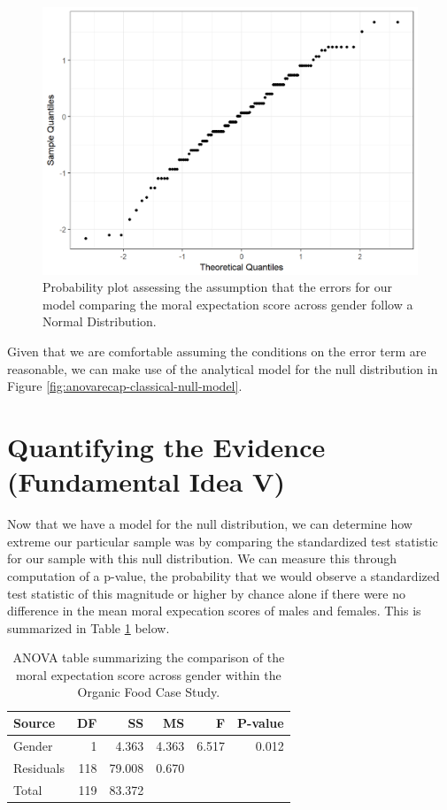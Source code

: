 \documentclass[]{book}
\theoremstyle{definition}
\theoremstyle{definition}
\theoremstyle{definition}
\theoremstyle{remark}
\begin{document}
\begin{figure}

{\centering \includegraphics[width=0.8\linewidth]{./Images/anovarecap-resids-probplot-1} 

}

\caption{Probability plot assessing the assumption that the errors for our model comparing the moral expectation score across gender follow a Normal Distribution.}\label{fig:anovarecap-resids-probplot}
\end{figure}

Given that we are comfortable assuming the conditions on the error term
are reasonable, we can make use of the analytical model for the null
distribution in Figure \ref{fig:anovarecap-classical-null-model}.

\section{Quantifying the Evidence (Fundamental Idea
V)}\label{quantifying-the-evidence-fundamental-idea-v-1}

Now that we have a model for the null distribution, we can determine how
extreme our particular sample was by comparing the standardized test
statistic for our sample with this null distribution. We can measure
this through computation of a p-value, the probability that we would
observe a standardized test statistic of this magnitude or higher by
chance alone if there were no difference in the mean moral expecation
scores of males and females. This is summarized in Table
\ref{tab:anovarecap-anova-table} below.

\begin{table}

\caption{\label{tab:anovarecap-anova-table}ANOVA table summarizing the comparison of the moral expectation score across gender within the Organic Food Case Study.}
\centering
\begin{tabular}[t]{l|r|r|r|r|r}
\hline
Source & DF & SS & MS & F & P-value\\
\hline
Gender & 1 & 4.363 & 4.363 & 6.517 & 0.012\\
\hline
Residuals & 118 & 79.008 & 0.670 &  & \\
\hline
Total & 119 & 83.372 &  &  & \\
\hline
\end{tabular}
\end{table}
\end{document}
